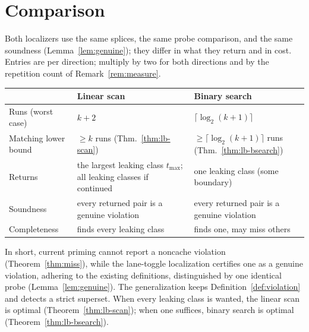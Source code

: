 \documentclass[11pt]{article}
\theoremstyle{definition}
\theoremstyle{plain}
\newcommand{\tmax}{t_{\max}}
\begin{document}
\section{Comparison}

Both localizers use the same splices, the same probe comparison, and the same soundness
(Lemma~\ref{lem:genuine}); they differ in what they return and in cost. Entries are per
direction; multiply by two for both directions and by the repetition count of
Remark~\ref{rem:measure}.

\begin{center}
\begin{tabular}{@{}l p{4.6cm} p{4.6cm}@{}}
\toprule
 & \textbf{Linear scan} & \textbf{Binary search} \\
\midrule
Runs (worst case) & $k+2$ & $\lceil\log_2(k+1)\rceil$ \\[2pt]
Matching lower bound & $\ge k$ runs (Thm.~\ref{thm:lb-scan}) & $\ge \lceil\log_2(k+1)\rceil$ runs (Thm.~\ref{thm:lb-bsearch}) \\[2pt]
Returns & the largest leaking class $\tmax$; all leaking classes if continued & one leaking class (some boundary) \\[2pt]
Soundness & every returned pair is a genuine violation & every returned pair is a genuine violation \\[2pt]
Completeness & finds every leaking class & finds one, may miss others \\
\bottomrule
\end{tabular}
\end{center}

In short, current priming cannot report a noncache violation (Theorem~\ref{thm:miss}),
while the lane-toggle localization certifies one as a genuine violation, adhering to the
existing definitions, distinguished by one identical probe (Lemma~\ref{lem:genuine}).
The generalization keeps Definition~\ref{def:violation} and detects a strict superset.
When every leaking class is wanted, the linear scan is optimal (Theorem~\ref{thm:lb-scan});
when one suffices, binary search is optimal (Theorem~\ref{thm:lb-bsearch}).
\end{document}
